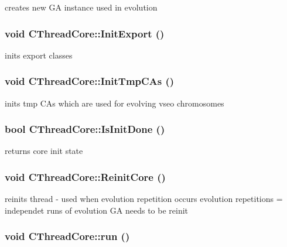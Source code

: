 \label{classCThreadCore_ad0bfe748e42ad65bbe82df1070c8c95e}
creates new GA instance used in evolution \hypertarget{classCThreadCore_abde63c16350bd57c9ecc539195a84e91}{
\subsubsection[{InitExport}]{\setlength{\rightskip}{0pt plus 5cm}void CThreadCore::InitExport ()}}
\label{classCThreadCore_abde63c16350bd57c9ecc539195a84e91}
inits export classes \hypertarget{classCThreadCore_a4e710409fd00cd204c837db052506879}{
\subsubsection[{InitTmpCAs}]{\setlength{\rightskip}{0pt plus 5cm}void CThreadCore::InitTmpCAs ()}}
\label{classCThreadCore_a4e710409fd00cd204c837db052506879}
inits tmp CAs which are used for evolving vseo chromosomes \hypertarget{classCThreadCore_a85b03fa847d72661b2710af2beaa70dd}{
\subsubsection[{IsInitDone}]{\setlength{\rightskip}{0pt plus 5cm}bool CThreadCore::IsInitDone ()}}
\label{classCThreadCore_a85b03fa847d72661b2710af2beaa70dd}
returns core init state \hypertarget{classCThreadCore_a6d63012cb404af5d7b18017d8299a603}{
\subsubsection[{ReinitCore}]{\setlength{\rightskip}{0pt plus 5cm}void CThreadCore::ReinitCore ()}}
\label{classCThreadCore_a6d63012cb404af5d7b18017d8299a603}
reinits thread -\/ used when evolution repetition occurs evolution repetitions = independet runs of evolution GA needs to be reinit \hypertarget{classCThreadCore_af78150953eef0f33cf28125f137d7fbb}{
\subsubsection[{run}]{\setlength{\rightskip}{0pt plus 5cm}void CThreadCore::run ()}}
